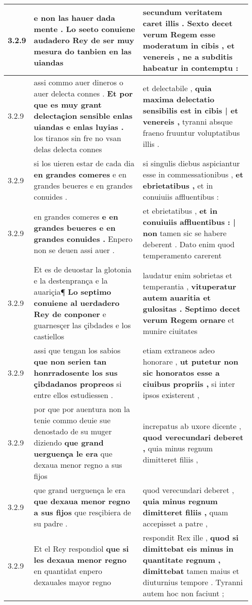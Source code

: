 \begin{tabular}{|p{1cm}|p{6.5cm}|p{6.5cm}|}
3.2.9 & e non las hauer dada mente . \textbf{ Lo seeto conuiene audadero Rey de ser muy mesura } do tanbien en las uiandas & secundum veritatem caret illis . \textbf{ Sexto decet verum Regem esse moderatum in cibis , et venereis , } ne a subditis habeatur in contemptu : \\\hline
3.2.9 & assi commo auer dineros o auer delecta connes . \textbf{ Et por que es muy grant delectaçion sensible enlas uiandas e enlas luyias . } los tiranos sin fre no vsan delas delecta connes & et delectabile , \textbf{ quia maxima delectatio sensibilis est in cibis | et venereis , } tyranni absque fraeno fruuntur voluptatibus illis . \\\hline
3.2.9 & si los uieren estar de cada dia \textbf{ en grandes comeres } e en grandes beueres e en grandes conuides . & si singulis diebus aspiciantur esse in commessationibus , \textbf{ et ebrietatibus , } et in conuiuiis affluentibus : \\\hline
3.2.9 & en grandes comeres \textbf{ e en grandes beueres e en grandes conuides . } Enpero non se deuen assi auer . & et ebrietatibus , \textbf{ et in conuiuiis affluentibus : | non } tamen sic se habere deberent . Dato enim quod temperamento carerent \\\hline
3.2.9 & Et es de deuostar la glotonia e la destenprança e la auariçia¶ \textbf{ Lo septimo conuiene al uerdadero Rey de conponer } e guarnesçer las çibdades e los castiellos & laudatur enim sobrietas et temperantia , \textbf{ vituperatur autem auaritia et gulositas . Septimo decet verum Regem ornare } et munire ciuitates \\\hline
3.2.9 & assi que tengan los sabios \textbf{ que non serien tan honrradosente los sus çibdadanos propreos } si entre ellos estudiessen . & etiam extraneos adeo honorare , \textbf{ ut putetur non sic honoratos esse a ciuibus propriis , } si inter ipsos existerent , \\\hline
3.2.9 & por que por auentura non la tenie commo deuie sue denostado de su muger diziendo \textbf{ que grand uerguença le era } que dexaua menor regno a sus fijos & increpatus ab uxore dicente , \textbf{ quod verecundari deberet , } quia minus regnum dimitteret filiis , \\\hline
3.2.9 & que grand uerguença le era \textbf{ que dexaua menor regno a sus fijos } que resçibiera de su padre . & quod verecundari deberet , \textbf{ quia minus regnum dimitteret filiis , } quam accepisset a patre , \\\hline
3.2.9 & Et el Rey respondiol \textbf{ que si les dexaua menor regno } en quantidat enpero dexauales mayor regno & respondit Rex ille , \textbf{ quod si dimittebat eis minus in quantitate regnum , dimittebat } tamen maius et diuturnius tempore . Tyranni autem hoc non faciunt ; \\\hline

\end{tabular}

